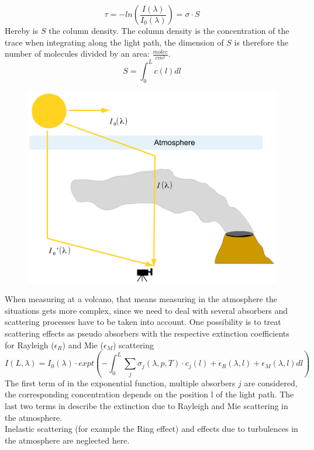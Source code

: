 \documentclass  [
  paper    = a4,
  BCOR     = 10mm,
  twoside,
  fontsize = 12pt,
  fleqn,
  toc      = bibnumbered,
  toc      = listofnumbered,
  numbers  = noendperiod,
  headings = normal,
  listof   = leveldown,
  version  = 3.03
]                                       {scrreprt}
\begin{document}
	\begin{equation}
	\tau = -ln\left(\frac{I\left(\lambda\right)}{I_{0}\left(\lambda\right)}\right) = \sigma\cdot S
	\end{equation}
	Hereby is $S$ the column density. The column density is the concentration of the trace when integrating along the light path, the dimension of $S$ is therefore the number of molecules divided by an area: $\frac{molec}{cm^2}$.
	\begin{equation}
	S = \int_{0}^{L}c\left(l\right)dl
	\end{equation}
	\begin{figure}
		\centering
		\includegraphics[width=0.7\linewidth]{Bilder/DOASFunction}
		\caption{}
		\label{fig:doasfunction}
	\end{figure}
	
	When measuring at a volcano, that means measuring in the atmosphere the situations gets more complex, since we need to deal with several absorbers and scattering processes have to be taken into account. One possibility is to treat scattering effects as pseudo absorbers with the respective extinction coefficients for Rayleigh ($\epsilon_R$) and  Mie ($\epsilon_M$) scattering
	\begin{equation}
	I\left(L,\lambda\right) = I_{0}\left(\lambda\right)\cdot expt\left(-\int^{L}_{0}\sum_{j}\sigma_{j}\left(\lambda,p,T\right)\cdot
	c_{j}\left(l\right)+\epsilon_R\left(\lambda,l\right)+\epsilon_{M}\left(\lambda,l\right)dl\right)
	\label{eq:lbe}
	\end{equation}
	The first term of  in the exponential function, multiple absorbers $j$ are considered, the corresponding concentration depends on the position l of the light path.
	The last two terms in describe the extinction due to Rayleigh and Mie scattering in the atmosphere.\\
	Inelastic scattering (for example the Ring effect) and effects due to turbulences in the atmosphere are neglected here.
\end{document}
